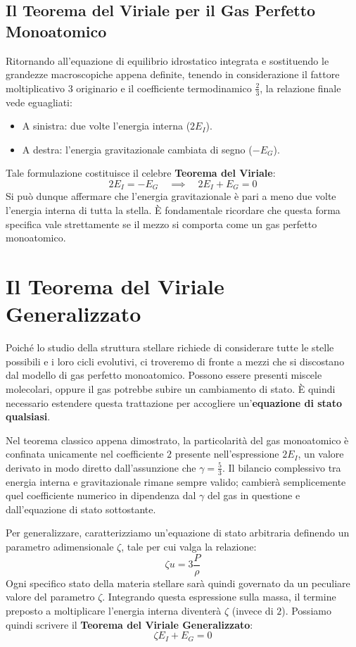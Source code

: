 \subsection{Il Teorema del Viriale per il Gas Perfetto Monoatomico}
Ritornando all'equazione di equilibrio idrostatico integrata e sostituendo le grandezze macroscopiche appena definite, tenendo in considerazione il fattore moltiplicativo $3$ originario e il coefficiente termodinamico $\frac{2}{3}$, la relazione finale vede eguagliati:
\begin{itemize}
\item A sinistra: due volte l'energia interna ($2 E_I$).
\item A destra: l'energia gravitazionale cambiata di segno ($-E_G$).
\end{itemize}
Tale formulazione costituisce il celebre \textbf{Teorema del Viriale}:
\begin{equation}
2 E_I = - E_G \quad \implies \quad 2 E_I + E_G = 0
\end{equation}
Si può dunque affermare che l'energia gravitazionale è pari a meno due volte l'energia interna di tutta la stella. È fondamentale ricordare che questa forma specifica vale strettamente se il mezzo si comporta come un gas perfetto monoatomico.

\section{Il Teorema del Viriale Generalizzato}

Poiché lo studio della struttura stellare richiede di considerare tutte le stelle possibili e i loro cicli evolutivi, ci troveremo di fronte a mezzi che si discostano dal modello di gas perfetto monoatomico. Possono essere presenti miscele molecolari, oppure il gas potrebbe subire un cambiamento di stato. È quindi necessario estendere questa trattazione per accogliere un'\textbf{equazione di stato qualsiasi}.

Nel teorema classico appena dimostrato, la particolarità del gas monoatomico è confinata unicamente nel coefficiente $2$ presente nell'espressione $2 E_I$, un valore derivato in modo diretto dall'assunzione che $\gamma = \frac{5}{3}$.
Il bilancio complessivo tra energia interna e gravitazionale rimane sempre valido; cambierà semplicemente quel coefficiente numerico in dipendenza dal $\gamma$ del gas in questione e dall'equazione di stato sottostante.

Per generalizzare, caratterizziamo un'equazione di stato arbitraria definendo un parametro adimensionale $\zeta$, tale per cui valga la relazione:
\begin{equation}
\zeta u = 3 \frac{P}{\rho}
\end{equation}
Ogni specifico stato della materia stellare sarà quindi governato da un peculiare valore del parametro $\zeta$. Integrando questa espressione sulla massa, il termine preposto a moltiplicare l'energia interna diventerà $\zeta$ (invece di $2$). Possiamo quindi scrivere il \textbf{Teorema del Viriale Generalizzato}:
\begin{equation}
\zeta E_I + E_G = 0
\end{equation}

